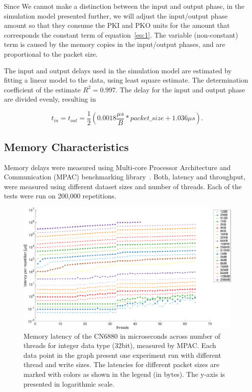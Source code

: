 Since We cannot make a distinction between the input and output phase, in the simulation model presented further, we will adjust the input/output phase amount so that they consume the PKI and PKO units for the amount that corresponds the constant term of equation~\ref{eq:1}. The variable (non-constant) term is caused by the memory copies in the input/output phases, and are proportional to the packet size.

The input and output delays used in the simulation model are estimated by fitting a linear model to the data, using least square estimate. The determination coefficient of the estimate $R^2 = 0.997$. The delay for the input and output phase are divided evenly, resulting in

\begin{equation}
  \label{eq:1}
  t_{in} = t_{out} = \frac{1}{2}(0.0018\frac{\mu s}{B} * packet\_size + 1.036\mu s).
\end{equation}

\subsection{Memory Characteristics}
\label{sec:memory-characteristics}

Memory delays were measured using Multi-core Processor Architecture and Communication (MPAC) benchmarking library~\cite{Jamal:2009:MPAC}. Both, latency and throughput, were measured using different dataset sizes and number of threads. Each of the tests were run on 200,000 repetitions.

\begin{figure}[]
  \begin{center}
    \includegraphics[width=\textwidth]{images/mem-latency.pdf}
    \caption{Memory latency of the CN6880 in microseconds across number of threads for integer data type (32bit), measured by MPAC. Each data point in the graph present one experiment run with different thread and write sizes. The latencies for different packet sizes are marked with colors as shown in the legend (in bytes). The y-axis is presented in logarithmic scale.}
    \label{fig:mem-latency}
  \end{center}
\end{figure}

